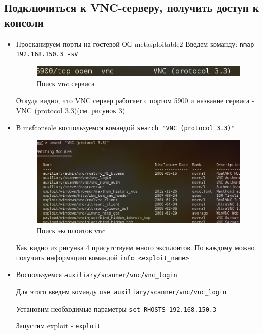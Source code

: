 \documentclass[11pt, a4paper]{article}		%
\begin{document}

\subsection{Подключиться к VNC-серверу, получить доступ к консоли}

\begin{itemize}
\item Просканируем порты на гостевой ОС metasploitable2
Введем команду: \verb'nmap 192.168.150.3 -sV'

\begin{figure}[h!]
\centering
\includegraphics[scale=0.8]{res/vnc_service}
\caption{Поиск vnc сервиса}
\end{figure}

Откуда видно, что VNC сервер работает с портом 5900 и название сервиса - VNC (protocol 3.3)(см. рисунок 3)

\item В msfconsole воспользуемся командой \verb'search "VNC (protocol 3.3)"'

\begin{figure}[h!]
\centering
\includegraphics[scale=0.8]{res/search_vnc}
\caption{Поиск эксплоитов vnc}
\end{figure}

Как видно из рисунка 4 присутствуем много эксплоитов. По каждому можно получить информацию командой \verb'info <exploit_name>' 

\item Воспользуемся \verb'auxiliary/scanner/vnc/vnc_login'

Для этого введем команду \verb'use auxiliary/scanner/vnc/vnc_login'

Установим необходимые параметры \verb'set RHOSTS 192.168.150.3'

Запустим exploit - \verb'exploit'


\end{itemize}
\end{document}
